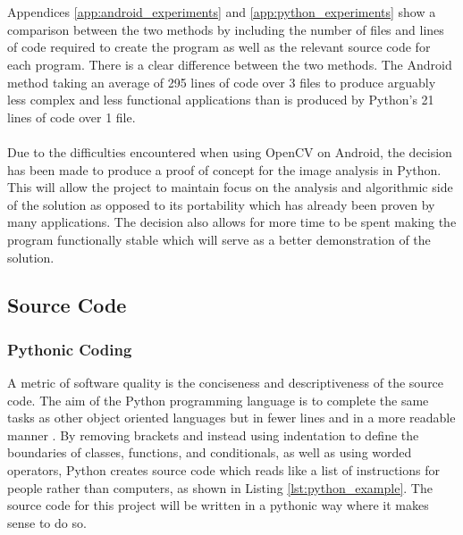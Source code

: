		\\\\
		Appendices \ref{app:android_experiments} and \ref{app:python_experiments} show a comparison between the two methods by including the number of files and lines of code required to create the program as well as the relevant source code for each program. There is a clear difference between the two methods. The Android method taking an average of 295 lines of code over 3 files to produce arguably less complex and less functional applications than is produced by Python’s 21 lines of code over 1 file.
		\\\\
		Due to the difficulties encountered when using OpenCV on Android, the decision has been made to produce a proof of concept for the image analysis in Python. This will allow the project to maintain focus on the analysis and algorithmic side of the solution as opposed to its portability which has already been proven by many applications. The decision also allows for more time to be spent making the program functionally stable which will serve as a better demonstration of the solution.
	\subsection{Source Code}
		\subsubsection{Pythonic Coding}
			A metric of software quality is the conciseness and descriptiveness of the source code. The aim of the Python programming language is to complete the same tasks as other object oriented languages but in fewer lines and in a more readable manner \citep{kuhlman2009python}. By removing brackets and instead using indentation to define the boundaries of classes, functions, and conditionals, as well as using worded operators, Python creates source code which reads like a list of instructions for people rather than computers, as shown in Listing \ref{lst:python_example}. The source code for this project will be written in a pythonic way where it makes sense to do so.
